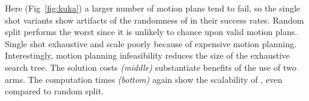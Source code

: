 Here (Fig~\ref{fig:kuka}) a larger number of motion plans tend to fail, so the single shot variants show artifacts of the randomness of \drrtstar in their success rates. 
Random split performs the worst since it is unlikely to chance upon valid motion plans. Single shot exhaustive and \milp scale poorly because of expensive motion planning.
Interestingly, motion planning infeasibility reduces the size of the exhaustive search tree.
The solution costs \textit{(middle)} substantiate benefits of the use of two arms. The computation times \textit{(bottom)} again show the scalability of \algo, even compared to random split.



